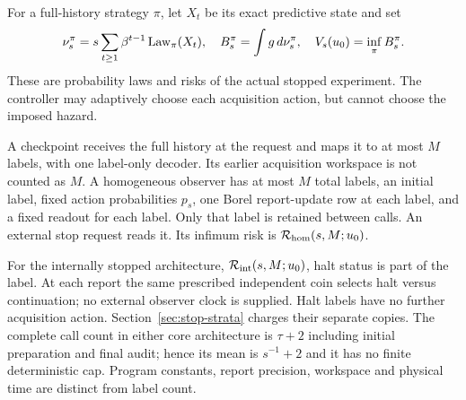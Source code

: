 For a full-history strategy $\pi$, let $X_t$ be its exact predictive state and set
\begin{equation}\label{eq:occupation}
 \nu_s^\pi=s\sum_{t\ge1}\beta^{t-1}\operatorname{Law}_\pi(X_t),\quad
 B_s^\pi=\int g\,d\nu_s^\pi,\quad V_s(u_0)=\inf_\pi B_s^\pi.
\end{equation}
These are probability laws and risks of the actual stopped experiment. The controller may adaptively choose each acquisition action, but cannot choose the imposed hazard.

A checkpoint receives the full history at the request and maps it to at most $M$ labels, with one label-only decoder. Its earlier acquisition workspace is not counted as $M$. A homogeneous observer has at most $M$ total labels, an initial label, fixed action probabilities $p_s$, one Borel report-update row at each label, and a fixed readout for each label. Only that label is retained between calls. An external stop request reads it. Its infimum risk is $\mathcal R_{\rm hom}(s,M;u_0)$.

For the internally stopped architecture, $\mathcal R_{\rm int}(s,M;u_0)$, halt status is part of the label. At each report the same prescribed independent coin selects halt versus continuation; no external observer clock is supplied. Halt labels have no further acquisition action. Section~\ref{sec:stop-strata} charges their separate copies. The complete call count in either core architecture is $\tau+2$ including initial preparation and final audit; hence its mean is $s^{-1}+2$ and it has no finite deterministic cap. Program constants, report precision, workspace and physical time are distinct from label count.
